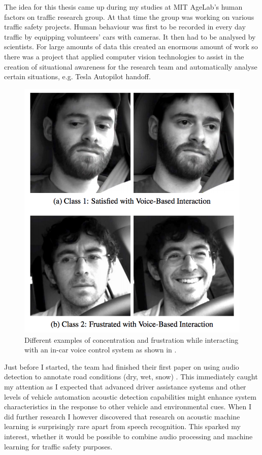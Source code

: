 
The idea for this thesis came up during my studies at MIT AgeLab's human factors on traffic research group. At that time the group was working on various traffic safety projects. Human behaviour was first to be recorded in every day traffic by equipping volunteers' cars with cameras. It then had to be analysed by scientists. For large amounts of data this created an enormous amount of work so there was a project that applied computer vision technologies to assist in the creation of situational awareness for the research team and automatically analyse certain situations, e.g. Tesla Autopilot handoff. 


\begin{figure}[h]
    \centering
	\includegraphics[width=.85\textwidth]{./images/illustrations/driver-frustration}
    \caption{Different examples of concentration and frustration while interacting with an in-car voice control system as shown in \cite{Abdic:2016:DFD:3060621.3060809}.}
    \label{fig:am}
\end{figure}


Just before I started, the team had finished their first paper on using audio detection to annotate road conditions (dry, wet, snow) \cite{Abdic:2016:DFD:3060621.3060809}. This immediately caught my attention as I expected that advanced driver assistance systems and other levels of vehicle automation acoustic detection capabilities might enhance system characteristics in the response to other vehicle and environmental cues. When I did further research I however discovered that research on acoustic machine learning is surprisingly rare apart from speech recognition. This sparked my interest, whether it would be possible to combine audio processing and machine learning for traffic safety purposes. 


